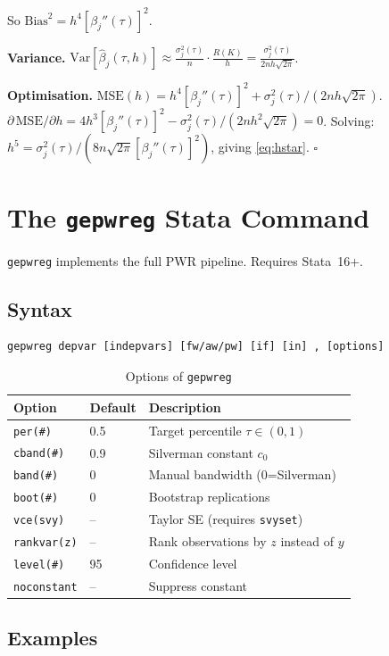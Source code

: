 \documentclass[12pt,a4paper]{article}
\theoremstyle{definition}
\begin{document}
So $\mathrm{Bias}^2 = h^4[\beta_j''(\tau)]^2$.

\textbf{Variance.}
$\mathrm{Var}[\hat\beta_j(\tau,h)] \approx
\frac{\sigma_j^2(\tau)}{n}\cdot\frac{R(K)}{h} =
\frac{\sigma_j^2(\tau)}{2nh\sqrt{2\pi}}$.

\textbf{Optimisation.}
$\mathrm{MSE}(h) = h^4[\beta_j''(\tau)]^2 +
\sigma_j^2(\tau)/(2nh\sqrt{2\pi})$.
$\partial\,\mathrm{MSE}/\partial h = 4h^3[\beta_j''(\tau)]^2 -
\sigma_j^2(\tau)/(2nh^2\sqrt{2\pi}) = 0$.
Solving: $h^5 = \sigma_j^2(\tau)/(8n\sqrt{2\pi}[\beta_j''(\tau)]^2)$,
giving \eqref{eq:hstar}. $\square$

\section{The \texttt{gepwreg} Stata Command}
\label{app:gepwreg}

\texttt{gepwreg} implements the full PWR pipeline. Requires Stata~16+.

\subsection{Syntax}
\begin{verbatim}
gepwreg depvar [indepvars] [fw/aw/pw] [if] [in] , [options]
\end{verbatim}

\begin{table}[htbp]\centering\small
\caption{Options of \texttt{gepwreg}}
\begin{tabular}{l l p{6cm}}
\toprule Option&Default&Description\\\midrule
\texttt{per(\#)}&0.5&Target percentile $\tau\in(0,1)$\\
\texttt{cband(\#)}&0.9&Silverman constant $c_0$\\
\texttt{band(\#)}&0&Manual bandwidth (0=Silverman)\\
\texttt{boot(\#)}&0&Bootstrap replications\\
\texttt{vce(svy)}&--&Taylor SE (requires \texttt{svyset})\\
\texttt{rankvar(z)}&--&Rank observations by $z$ instead of $y$\\
\texttt{level(\#)}&95&Confidence level\\
\texttt{noconstant}&--&Suppress constant\\
\bottomrule
\end{tabular}
\end{table}

\subsection{Examples}
\end{document}
